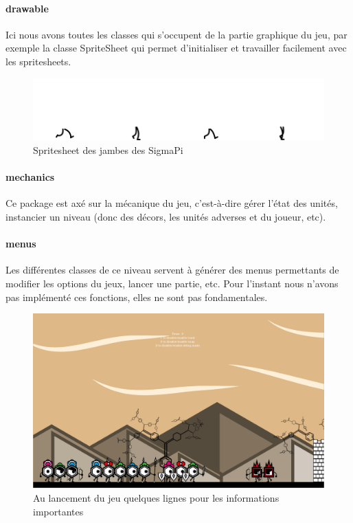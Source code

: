 \documentclass[a4paper,10pt]{article}
\begin{document}
  \paragraph{drawable}
  Ici nous avons toutes les classes qui s'occupent de la partie graphique du jeu, par exemple la classe SpriteSheet qui permet d'initialiser et travailler facilement avec les spritesheets.
 \begin{figure}[!h]
 \centering
 \vspace{-45pt}
 \includegraphics[scale=0.3]{images/legs}
 \caption{Spritesheet des jambes des SigmaPi}
 \end{figure}
  \paragraph{mechanics}
  Ce package est axé sur la mécanique du jeu, c'est-à-dire gérer l'état des unités, instancier un niveau (donc des décors, les unités adverses et du joueur, etc).
  \paragraph{menus}
  Les différentes classes de ce niveau servent à générer des menus permettants de modifier les options du jeux, lancer une partie, etc. Pour l'instant nous n'avons pas implémenté ces fonctions, elles ne sont pas fondamentales.
  \begin{figure}[!h]
 \centering
 \vspace{-10pt}
 \includegraphics[scale=0.2]{images/menu}
 \caption{Au lancement du jeu quelques lignes pour les informations importantes}
 \end{figure}
\end{document}
